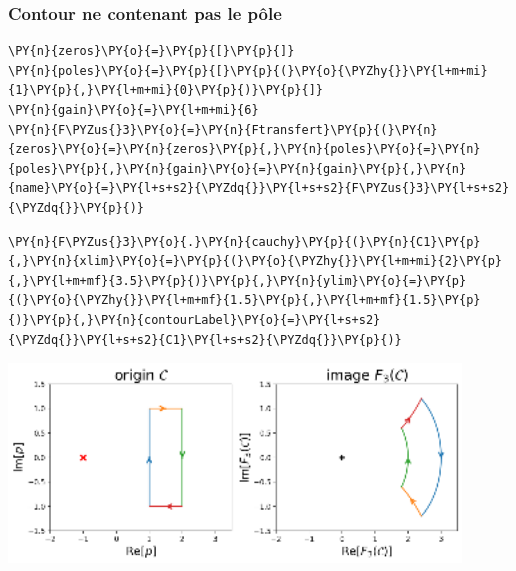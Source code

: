 \subsubsection{Contour ne contenant pas le pôle}
\begin{tcolorbox}[breakable, size=fbox, boxrule=1pt, pad at break*=1mm,colback=cellbackground, colframe=cellborder]
\begin{Verbatim}[commandchars=\\\{\}]
\PY{n}{zeros}\PY{o}{=}\PY{p}{[}\PY{p}{]}
\PY{n}{poles}\PY{o}{=}\PY{p}{[}\PY{p}{(}\PY{o}{\PYZhy{}}\PY{l+m+mi}{1}\PY{p}{,}\PY{l+m+mi}{0}\PY{p}{)}\PY{p}{]}
\PY{n}{gain}\PY{o}{=}\PY{l+m+mi}{6}
\PY{n}{F\PYZus{}3}\PY{o}{=}\PY{n}{Ftransfert}\PY{p}{(}\PY{n}{zeros}\PY{o}{=}\PY{n}{zeros}\PY{p}{,}\PY{n}{poles}\PY{o}{=}\PY{n}{poles}\PY{p}{,}\PY{n}{gain}\PY{o}{=}\PY{n}{gain}\PY{p}{,}\PY{n}{name}\PY{o}{=}\PY{l+s+s2}{\PYZdq{}}\PY{l+s+s2}{F\PYZus{}3}\PY{l+s+s2}{\PYZdq{}}\PY{p}{)}
\end{Verbatim}
\end{tcolorbox}
\begin{tcolorbox}[breakable, size=fbox, boxrule=1pt, pad at break*=1mm,colback=cellbackground, colframe=cellborder]
\begin{Verbatim}[commandchars=\\\{\}]
\PY{n}{F\PYZus{}3}\PY{o}{.}\PY{n}{cauchy}\PY{p}{(}\PY{n}{C1}\PY{p}{,}\PY{n}{xlim}\PY{o}{=}\PY{p}{(}\PY{o}{\PYZhy{}}\PY{l+m+mi}{2}\PY{p}{,}\PY{l+m+mf}{3.5}\PY{p}{)}\PY{p}{,}\PY{n}{ylim}\PY{o}{=}\PY{p}{(}\PY{o}{\PYZhy{}}\PY{l+m+mf}{1.5}\PY{p}{,}\PY{l+m+mf}{1.5}\PY{p}{)}\PY{p}{,}\PY{n}{contourLabel}\PY{o}{=}\PY{l+s+s2}{\PYZdq{}}\PY{l+s+s2}{C1}\PY{l+s+s2}{\PYZdq{}}\PY{p}{)}
\end{Verbatim}
\end{tcolorbox}
\begin{center}
    \includegraphics[width=0.9\textwidth]{notebook/fig/output_32_1.eps}
\end{center}
